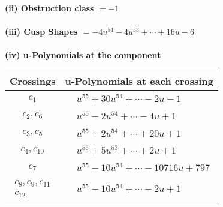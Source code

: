 \documentclass[1p]{elsarticle_modified}
\theoremstyle{definition}
\begin{document}
\flushleft \textbf{(ii) Obstruction class $= -1$}\\~\\
\flushleft \textbf{(iii) Cusp Shapes $= -4 u^{54}-4 u^{53}+\cdots+16 u-6$}\\~\\
\newpage\renewcommand{\arraystretch}{1}
\flushleft \textbf{(iv) u-Polynomials at the component}\newline \\
\begin{tabular}{m{50pt}|m{274pt}}
Crossings & \hspace{64pt}u-Polynomials at each crossing \\
\hline $$\begin{aligned}c_{1}\end{aligned}$$&$\begin{aligned}
&u^{55}+30 u^{54}+\cdots-2 u-1
\end{aligned}$\\
\hline $$\begin{aligned}c_{2},c_{6}\end{aligned}$$&$\begin{aligned}
&u^{55}-2 u^{54}+\cdots-4 u+1
\end{aligned}$\\
\hline $$\begin{aligned}c_{3},c_{5}\end{aligned}$$&$\begin{aligned}
&u^{55}+2 u^{54}+\cdots+20 u+1
\end{aligned}$\\
\hline $$\begin{aligned}c_{4},c_{10}\end{aligned}$$&$\begin{aligned}
&u^{55}+5 u^{53}+\cdots+2 u+1
\end{aligned}$\\
\hline $$\begin{aligned}c_{7}\end{aligned}$$&$\begin{aligned}
&u^{55}-10 u^{54}+\cdots-10716 u+797
\end{aligned}$\\
\hline $$\begin{aligned}c_{8},c_{9},c_{11}\\c_{12}\end{aligned}$$&$\begin{aligned}
&u^{55}-10 u^{54}+\cdots-2 u+1
\end{aligned}$\\
\hline
\end{tabular}\\~\\
\end{document}
